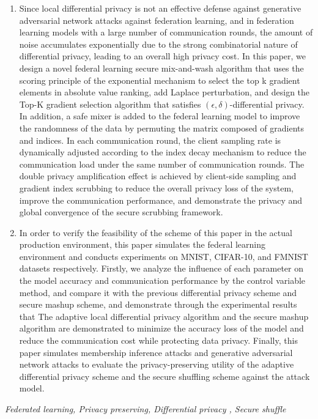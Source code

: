 \begin{enumerate}
	\item Since local differential privacy is not an effective defense against generative adversarial network attacks against federation learning, and in federation learning models with a large number of communication rounds, the amount of noise accumulates exponentially due to the strong combinatorial nature of differential privacy, leading to an overall high privacy cost. In this paper, we design a novel federal learning secure mix-and-wash algorithm that uses the scoring principle of the exponential mechanism to select the top k gradient elements in absolute value ranking, add Laplace perturbation, and design the Top-K gradient selection algorithm that satisfies $(\epsilon, \delta)$-differential privacy. In addition, a safe mixer is added to the federal learning model to improve the randomness of the data by permuting the matrix composed of gradients and indices. In each communication round, the client sampling rate is dynamically adjusted according to the index decay mechanism to reduce the communication load under the same number of communication rounds. The double privacy amplification effect is achieved by client-side sampling and gradient index scrubbing to reduce the overall privacy loss of the system, improve the communication performance, and demonstrate the privacy and global convergence of the secure scrubbing framework.

	\item In order to verify the feasibility of the scheme of this paper in the actual production environment, this paper simulates the federal learning environment and conducts experiments on MNIST, CIFAR-10, and FMNIST datasets respectively. Firstly, we analyze the influence of each parameter on the model accuracy and communication performance by the control variable method, and compare it with the previous differential privacy scheme and secure mashup scheme, and demonstrate through the experimental results that The adaptive local differential privacy algorithm and the secure mashup algorithm are demonstrated to minimize the accuracy loss of the model and reduce the communication cost while protecting data privacy. Finally, this paper simulates membership inference attacks and generative adversarial network attacks to evaluate the privacy-preserving utility of the adaptive differential privacy scheme and the secure shuffling scheme against the attack model.
\end{enumerate}
{} \textit{Federated learning, Privacy preserving, Differential privacy , Secure shuffle}



